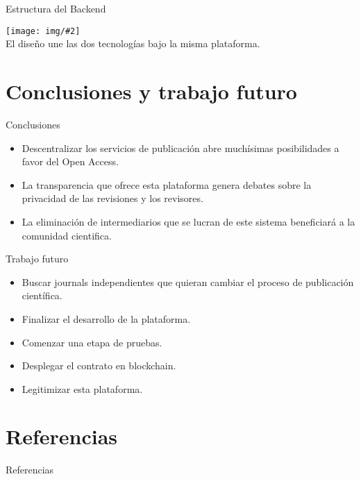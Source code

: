 \documentclass{beamer}
\newcommand{\framein}[3]{
  \begin{frame}{#1}
    \begin{center}
      \texttt{[image: img/\#2]}\\
      #3.
    \end{center}
  \end{frame}
}
\newcommand{\framet}[3]{
  \begin{frame}{#1}
    #2
  \end{frame}
}
\begin{document}
\framein{Estructura del Backend}{architecture.png}{El diseño une las dos
  tecnologías bajo la misma plataforma}

\section{Conclusiones y trabajo futuro}
\framet{Conclusiones}{
  \begin{itemize}
    \item Descentralizar los servicios de publicación abre muchísimas
      posibilidades a favor del Open Access.
    \item La transparencia que ofrece esta plataforma genera debates sobre la
      privacidad de las revisiones y los revisores.
    \item La eliminación de intermediarios que se lucran de este sistema
      beneficiará a la comunidad cientifica.
  \end{itemize}
}

\framet{Trabajo futuro}{
  \begin{itemize}
  \item Buscar journals independientes que quieran cambiar el proceso de publicación científica.
  \item Finalizar el desarrollo de la plataforma.
  \item Comenzar una etapa de pruebas.
  \item Desplegar el contrato en blockchain.
  \item Legitimizar esta plataforma.
  \end{itemize}
}

\section{Referencias}
\begin{frame}[allowframebreaks]{Referencias}
  

  \printbibliography
\end{frame}
\end{document}
